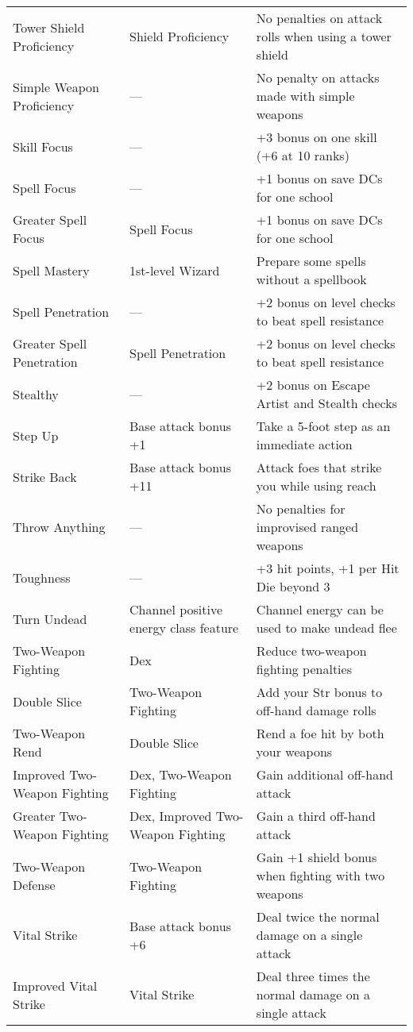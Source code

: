 \begin{table*}[]
\begin{tabularx}{\linewidth}{lXl}
\quad Tower Shield Proficiency & Shield Proficiency & No penalties on attack rolls when using a tower shield\\
Simple Weapon Proficiency & --- & No penalty on attacks made with simple weapons\\
Skill Focus & --- & +3 bonus on one skill (+6 at 10 ranks)\\
Spell Focus & --- & +1 bonus on save DCs for one school\\
\quad Greater Spell Focus & Spell Focus & +1 bonus on save DCs for one school\\
Spell Mastery & 1st-level Wizard & Prepare some spells without a spellbook\\
Spell Penetration & --- & +2 bonus on level checks to beat spell resistance\\
\quad Greater Spell Penetration & Spell Penetration & +2 bonus on level checks to beat spell resistance\\
Stealthy & --- & +2 bonus on Escape Artist and Stealth checks\\
Step Up & Base attack bonus +1 & Take a 5-foot step as an immediate action\\
Strike Back & Base attack bonus +11 & Attack foes that strike you while using reach\\
Throw Anything & --- & No penalties for improvised ranged weapons\\
Toughness & --- & +3 hit points, +1 per Hit Die beyond 3\\
Turn Undead & Channel positive energy class feature & Channel energy can be used to make undead flee\\
Two-Weapon Fighting & Dex & Reduce two-weapon fighting penalties\\
\quad Double Slice & Two-Weapon Fighting & Add your Str bonus to off-hand damage rolls\\
\quad \quad Two-Weapon Rend & Double Slice & Rend a foe hit by both your weapons\\
\quad Improved Two-Weapon Fighting & Dex, Two-Weapon Fighting & Gain additional off-hand attack\\
\quad \quad Greater Two-Weapon Fighting & Dex, Improved Two-Weapon Fighting & Gain a third off-hand attack\\
\quad Two-Weapon Defense & Two-Weapon Fighting & Gain +1 shield bonus when fighting with two weapons\\
Vital Strike & Base attack bonus +6 & Deal twice the normal damage on a single attack\\
\quad Improved Vital Strike & Vital Strike & Deal three times the normal damage on a single attack\\

\end{tabularx}
\end{table*}
